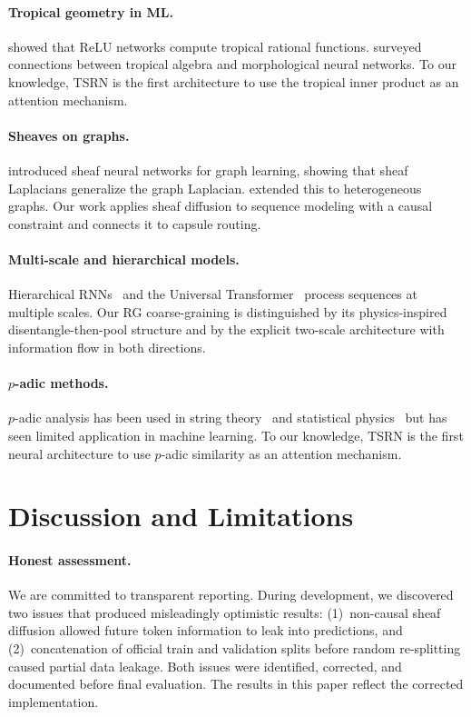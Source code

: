\documentclass[11pt,a4paper]{article}
\begin{document}
\paragraph{Tropical geometry in ML.}
\citet{zhang2018tropical} showed that ReLU networks compute tropical
rational functions.  \citet{maragos2021tropical} surveyed connections
between tropical algebra and morphological neural networks.
To our knowledge, TSRN is the first architecture to use the tropical
inner product as an attention mechanism.

\paragraph{Sheaves on graphs.}
\citet{hansen2020sheaf} introduced sheaf neural networks for graph
learning, showing that sheaf Laplacians generalize the graph
Laplacian.  \citet{bodnar2022neural} extended this to heterogeneous
graphs.  Our work applies sheaf diffusion to sequence modeling with a
causal constraint and connects it to capsule routing.

\paragraph{Multi-scale and hierarchical models.}
Hierarchical RNNs~\citep{chung2016hierarchical} and the Universal
Transformer~\citep{dehghani2019universal} process sequences at
multiple scales.  Our RG coarse-graining is distinguished by its
physics-inspired disentangle-then-pool structure and by the explicit
two-scale architecture with information flow in both directions.

\paragraph{$p$-adic methods.}
$p$-adic analysis has been used in string
theory~\citep{freund1987adelic} and statistical
physics~\citep{parisi1999p} but has seen limited application in
machine learning.  To our knowledge, TSRN is the first neural
architecture to use $p$-adic similarity as an attention mechanism.


\section{Discussion and Limitations}
\label{sec:discussion}

\paragraph{Honest assessment.}
We are committed to transparent reporting.  During development, we
discovered two issues that produced misleadingly optimistic results:
(1)~non-causal sheaf diffusion allowed future token information to
leak into predictions, and (2)~concatenation of official train and
validation splits before random re-splitting caused partial data
leakage.  Both issues were identified, corrected, and documented
before final evaluation.  The results in this paper reflect the
corrected implementation.
\end{document}
